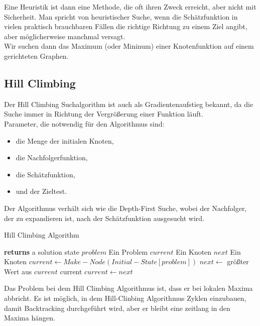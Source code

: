 Eine Heuristik ist dann eine Methode, die oft ihren Zweck erreicht, aber nicht mit Sicherheit. Man spricht von heuristischer Suche, wenn die Schätzfunktion in vielen praktisch brauchbaren Fällen die richtige Richtung zu einem Ziel angibt, aber möglicherweise manchmal versagt.\\

Wir suchen dann das Maximum (oder Mininum) einer Knotenfunktion auf einem gerichteten Graphen.\\

\subsection{Hill Climbing}
\bigskip
Der Hill Climbing Suchalgorithm ist auch als Gradientenaufstieg bekannt, da die Suche immer in Richtung der Vergrößerung einer Funktion läuft.\\

Parameter, die notwendig für den Algorithmus sind:

\begin{itemize}
  \item die Menge der initialen Knoten,
  \item die Nachfolgerfunktion,
  \item die Schätzfunktion,
  \item und der Zieltest.
\end{itemize}

Der Algorithmus verhält sich wie die Depth-First Suche, wobei der Nachfolger, der zu expandieren ist, nach der Schätzfunktion ausgesucht wird.\\

\begin{algorithm}
\caption{Hill Climbing Algorithm}
\begin{algorithmic}[1]
 \State \textbf{returns} a solution state
\INPUT
\Statex $problem$ \Comment Ein Problem
\Statex $current$  \Comment Ein Knoten
\Statex $next$  \Comment Ein Knoten
\State $current \gets Make-Node(Initial-State[problem])$
\Loop
\State $next \gets$ größter Wert aus $current$
 \Return current
\EndIf
\State $current \gets next$
\EndLoop
\EndFunction
\end{algorithmic}
\end{algorithm}


Das Problem bei dem Hill Climbing Algorithmus ist, dass er bei lokalen Maxima abbricht. Es ist möglich, in dem Hill-Clinbing Algorithmus Zyklen einzubauen, damit Backtracking durchgeführt wird, aber er bleibt eine zeitlang in den Maxima hängen.\\

